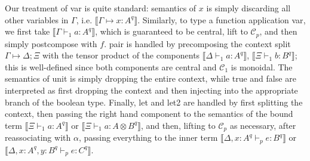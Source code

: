 \documentclass[acmsmall,screen,review]{acmart}
\newcommand{\mc}[1]{\ensuremath{\mathcal{#1}}}
\newcommand{\csplits}[3]{#1 \mapsto #2;#3}
\newcommand{\cwk}[2]{#1 \mapsto #2}
\newcommand{\thyp}[3]{#1: {#2}^{#3}}
\newcommand{\rle}[1]{{\scriptsize\textsf{#1}}}
\newcommand{\hasty}[5]{#1 \vdash_{#2} #3: {#4}^{#5}}
\newcommand{\dnt}[1]{\llbracket{#1}\rrbracket}
\begin{document}
Our treatment of \rle{var} is quite standard: semantics of \(x\) is simply
discarding all other variables in \(\Gamma\), i.e.
\(\dnt{\cwk{\Gamma}{\thyp{x}{A}{q}}}\). Similarly, to type a function
application \rle{var}, we first take \(\dnt{\hasty{\Gamma}{1}{a}{A}{q}}\), which
is guaranteed to be central, lift to \(\mc{C}_p\), and then simply postcompose
with \(f\). \rle{pair} is handled by precomposing the context split
\(\csplits{\Gamma}{\Delta}{\Xi}\) with the tensor product of the components
\(\dnt{\hasty{\Delta}{1}{a}{A}{q}}\), \(\dnt{\hasty{\Xi}{1}{b}{B}{q}}\); this is
well-defined since both components are central and \(\mc{C}_1\) is monoidal. The
semantics of \rle{unit} is simply dropping the entire context, while \rle{true}
and \rle{false} are interpreted as first dropping the context and then injecting
into the appropriate branch of the boolean type. Finally, \rle{let} and
\rle{let2} are handled by first splitting the context, then passing the right
hand component to the semantics of the bound term
\(\dnt{\hasty{\Xi}{1}{a}{A}{q}}\) or \(\dnt{\hasty{\Xi}{1}{a}{A \otimes
B}{q}}\), and then, lifting to \(\mc{C}_p\) as necessary, after reassociating
with \(\alpha\), passing everything to the inner term \(\dnt{\hasty{\Delta,
\thyp{x}{A}{q}}{p}{e}{B}{q}}\) or \(\dnt{\hasty{\Delta, \thyp{x}{A}{q},
\thyp{y}{B}{q}}{p}{e}{C}{q}}\). \
\end{document}
